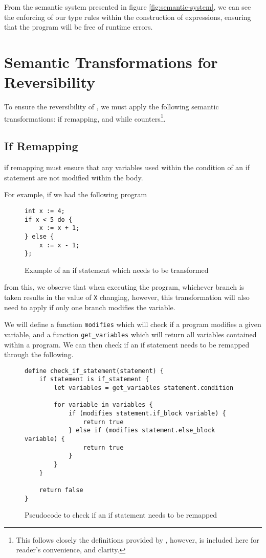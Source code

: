From the semantic system presented in figure \ref{fig:semantic-system}, we can see the enforcing of our type rules within the construction of expressions, ensuring that the program will be free of runtime errors.


\section{Semantic Transformations for Reversibility}

To ensure the reversibility of \rimplang, we must apply the following semantic transformations: if remapping, and while counters\footnote{This follows closely the definitions provided by \rimplang, however, is included here for reader's convenience, and clarity.}.

\subsection{If Remapping}

if remapping must ensure that any variables used within the condition of an if statement are not modified within the body.

For example, if we had the following program

\begin{figure}[ht]
    \centering
    \begin{lstlisting}[label={lst:ifexample}, basicstyle=\small]
int x := 4;
if x < 5 do {
    x := x + 1;
} else {
    x := x - 1;
};
    \end{lstlisting}
    \caption{Example of an if statement which needs to be transformed}
    \label{fig:ifexample}
\end{figure}

from this, we observe that when executing the program, whichever branch is taken results in the value of \lstinline{X} changing, however, this transformation will also need to apply if only one branch modifies the variable.

We will define a function \lstinline{modifies} which will check if a \rimplang program modifies a given variable, and a function \lstinline{get_variables} which will return all variables contained within a \rimplang program.
We can then check if an if statement needs to be remapped through the following.

\begin{figure}[ht]
    \centering
    \begin{lstlisting}[label={lst:ifcheckpseudo}, basicstyle=\small]
define check_if_statement(statement) {
    if statement is if_statement {
        let variables = get_variables statement.condition

        for variable in variables {
            if (modifies statement.if_block variable) {
                return true
            } else if (modifies statement.else_block variable) {
                return true
            }
        }
    }

    return false
}
    \end{lstlisting}
    \caption{Pseudocode to check if an if statement needs to be remapped}
    \label{fig:ifcheckpseudo}
\end{figure}


